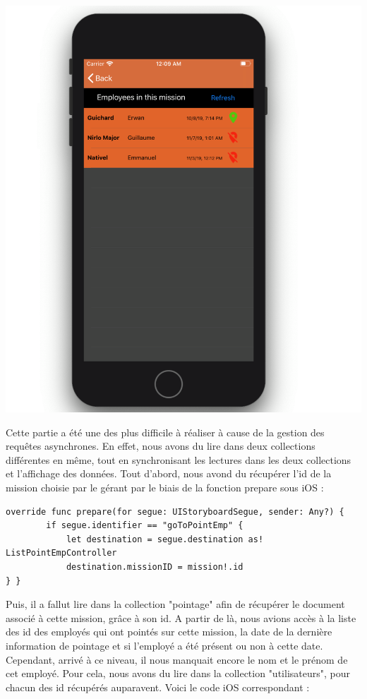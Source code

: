\documentclass{article}
\begin{document}
\begin{center}
    \includegraphics[scale=0.15]{pointageIOS.png}
\end{center}

Cette partie a été une des plus difficile à réaliser à cause de la gestion des requêtes asynchrones. En effet, nous avons du lire dans deux collections différentes en même, tout en synchronisant les lectures dans les deux collections et l'affichage des données. 
Tout d'abord, nous avond du récupérer l'id de la mission choisie par le gérant par le biais de la fonction prepare sous iOS : 

\begin{verbatim}
override func prepare(for segue: UIStoryboardSegue, sender: Any?) {
        if segue.identifier == "goToPointEmp" {
            let destination = segue.destination as! ListPointEmpController
            destination.missionID = mission!.id
} }
\end{verbatim}

Puis, il a fallut lire dans la collection "pointage" afin de récupérer le document associé à cette mission, grâce à son id. A partir de là, nous avions accès à la liste des id des employés qui ont pointés sur cette mission, la date de la dernière information de pointage et si l'employé a été présent ou non à cette date. Cependant, arrivé à ce niveau, il nous manquait encore le nom et le prénom de cet employé. Pour cela, nous avons du lire dans la collection "utilisateurs", pour chacun des id récupérés auparavent. 
Voici le code iOS correspondant : 
\end{document}
